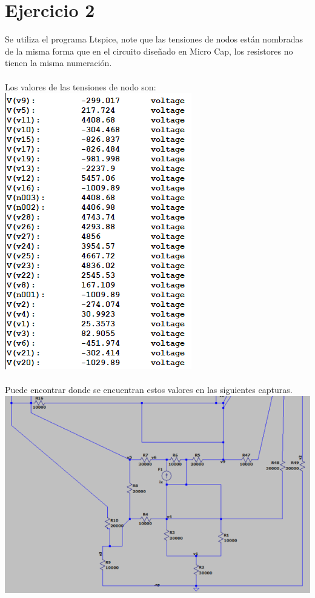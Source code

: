 \documentclass{article}
\begin{document}
\section{Ejercicio 2}
Se utiliza el programa Ltspice, note que las tensiones de nodos están nombradas de la misma forma que en el circuito diseñado en Micro Cap, los resistores no tienen la misma numeración.\\ \\
Los valores de las tensiones de nodo son:\\ 
\includegraphics[]{images/ltspicetensiones.PNG}\\ \\
Puede encontrar donde se encuentran estos valores en las siguientes capturas.\\
\includegraphics[]{images/ltspice1_75.PNG}\\ \\
\end{document}

